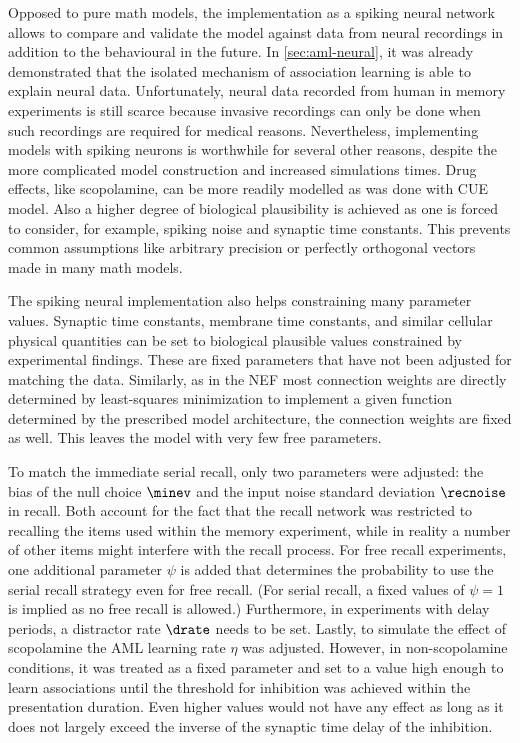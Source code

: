 Opposed to pure math models, the implementation as a spiking neural network allows to compare and validate the model against data from neural recordings in addition to the behavioural in the future.
In \cref{sec:aml-neural}, it was already demonstrated that the isolated mechanism of association learning is able to explain neural data.
Unfortunately, neural data recorded from human in memory experiments is still scarce because invasive recordings can only be done when such recordings are required for medical reasons.
Nevertheless, implementing models with spiking neurons is worthwhile for several other reasons, despite the more complicated model construction and increased simulations times.
Drug effects, like scopolamine, can be more readily modelled as was done with CUE model.
Also a higher degree of biological plausibility is achieved as one is forced to consider, for example, spiking noise and synaptic time constants.
This prevents common assumptions like arbitrary precision or perfectly orthogonal vectors made in many math models.

The spiking neural implementation also helps constraining many parameter values.
Synaptic time constants, membrane time constants, and similar cellular physical quantities can be set to biological plausible values constrained by experimental findings.
These are fixed parameters that have not been adjusted for matching the data.
Similarly, as in the NEF most connection weights are directly determined by least-squares minimization to implement a given function determined by the prescribed model architecture, the connection weights are fixed as well.
This leaves the model with very few free parameters.

To match the immediate serial recall, only two parameters were adjusted: the bias of the null choice $\minev$ and the input noise standard deviation $\recnoise$ in recall.
Both account for the fact that the recall network was restricted to recalling the items used within the memory experiment, while in reality a number of other items might interfere with the recall process.
For free recall experiments, one additional parameter $\psi$ is added that determines the probability to use the serial recall strategy even for free recall.
(For serial recall, a fixed values of $\psi = 1$ is implied as no free recall is allowed.)
Furthermore, in experiments with delay periods, a distractor rate $\drate$ needs to be set.
Lastly, to simulate the effect of scopolamine the AML learning rate $\eta$ was adjusted.
However, in non-scopolamine conditions, it was treated as a fixed parameter and set to a value high enough to learn associations until the threshold for inhibition was achieved within the presentation duration.
Even higher values would not have any effect as long as it does not largely exceed the inverse of the synaptic time delay of the inhibition.

